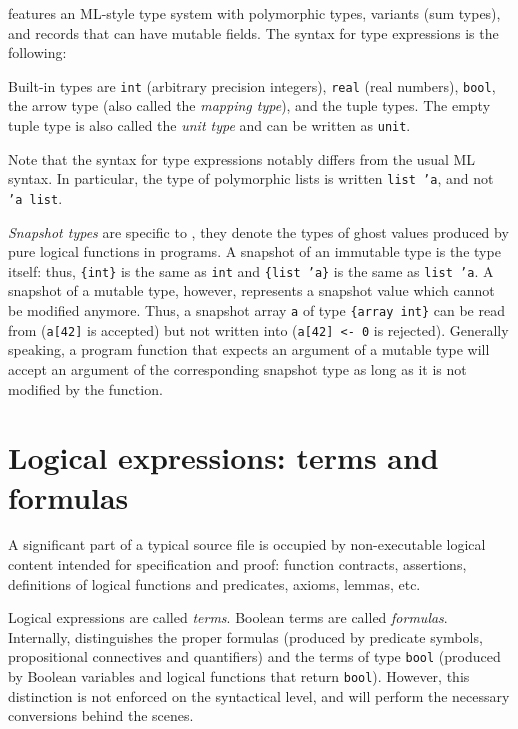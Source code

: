 \whyml features an ML-style type system with polymorphic types,
variants (sum types), and records that can have mutable fields.
The syntax for type expressions is the following:
\begin{center}\end{center}
Built-in types are \texttt{int} (arbitrary precision integers),
\texttt{real} (real numbers), \texttt{bool}, the arrow type
(also called the \textit{mapping type}),
and the tuple types.
The empty tuple type is also called the \textit{unit type}
and can be written as \texttt{unit}.

Note that the syntax for type expressions notably differs from
the usual ML syntax. In particular, the type of polymorphic lists
is written \texttt{list 'a}, and not \texttt{'a list}.

\textit{Snapshot types} are specific to \whyml, they denote
the types of ghost values produced by pure logical functions in
\whyml programs. A snapshot of an immutable type is the type
itself: thus, \texttt{\{int\}} is the same as \texttt{int} and
\texttt{\{list 'a\}} is the same as \texttt{list 'a}.
A snapshot of a mutable type, however, represents a snapshot
value which cannot be modified anymore. Thus, a snapshot array
\texttt{a} of type \texttt{\{array int\}} can be read from
(\texttt{a[42]} is accepted) but not written into
(\texttt{a[42] <- 0} is rejected). Generally speaking,
a program function that expects an argument of a mutable type
will accept an argument of the corresponding snapshot type
as long as it is not modified by the function.

\section{Logical expressions: terms and formulas}
\label{sec:terms}

A significant part of a typical \whyml source file is occupied
by non-executable logical content intended for specification
and proof: function contracts, assertions, definitions of
logical functions and predicates, axioms, lemmas, etc.

Logical expressions are called \textit{terms}. Boolean
terms are called \textit{formulas}. Internally, \why distinguishes
the proper formulas (produced by predicate symbols, propositional
connectives and quantifiers) and the terms of type \texttt{bool}
(produced by Boolean variables and logical functions that return
\texttt{bool}). However, this distinction is not enforced on the
syntactical level, and \why will perform the necessary conversions
behind the scenes.

